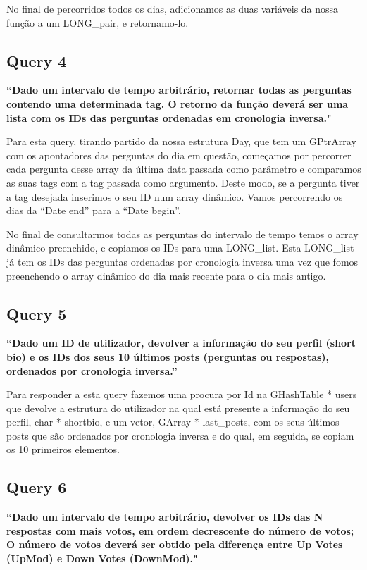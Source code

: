 \documentclass[a4paper]{report}
\begin{document}
No final de percorridos todos os dias, adicionamos as duas variáveis da nossa função a um LONG\_pair, e retornamo-lo.


\subsection*{Query 4}
\label{sec:query4}

\textbf{“Dado um intervalo de tempo arbitrário, retornar todas as perguntas contendo uma determinada tag.
O retorno da função deverá ser uma lista com os IDs das perguntas ordenadas em cronologia inversa."}

Para esta query, tirando partido da nossa estrutura Day, que tem um GPtrArray com
os apontadores das perguntas do dia em questão, começamos por percorrer cada pergunta desse array
da última data passada como parâmetro e comparamos as suas tags com a tag passada como argumento.
Deste modo, se a pergunta tiver a tag desejada inserimos o seu ID num array dinâmico.
Vamos percorrendo os dias da “Date end” para a “Date begin”.

No final de consultarmos todas as perguntas do intervalo de tempo temos o array dinâmico preenchido,
e copiamos os IDs para uma LONG\_list.
Esta LONG\_list já tem os IDs das perguntas ordenadas por cronologia inversa uma vez que
fomos preenchendo o array dinâmico do dia mais recente para o dia mais antigo.



\subsection*{Query 5}
\label{sec:query5}

\textbf{“Dado um ID de utilizador,  devolver a informação do
seu perfil (short bio) e os IDs dos seus 10 últimos posts (perguntas ou respostas),
ordenados por cronologia inversa.”}

Para responder a esta query fazemos uma procura por Id na GHashTable * users que devolve
a estrutura do utilizador na qual está presente a informação do
seu perfil, char * shortbio, e um vetor, GArray * last\_posts, com os seus últimos posts que são
ordenados por cronologia inversa e do qual, em seguida, se copiam os 10 primeiros
elementos.

\subsection*{Query 6}
\label{sec:query6}

\textbf{“Dado um intervalo de tempo arbitrário, devolver os IDs das N respostas
com mais votos, em ordem decrescente do número de votos; O número de votos deverá
ser obtido pela diferença entre Up Votes (UpMod) e Down Votes (DownMod)."}
\end{document}
